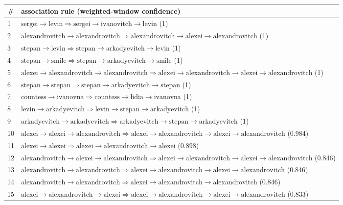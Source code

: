 \begin{appendices}
\begin{longtable}{p{20pt}|p{\dimexpr\textwidth-20pt-\tabcolsep\relax}}
\# & association rule (weighted-window confidence) \\
\hline
1 & $ \text{sergei} \to \text{levin} \Rightarrow \text{sergei} \to \text{ivanovitch} \to \text{levin} $ (1) \\
2 & $ \text{alexandrovitch} \to \text{alexandrovitch} \Rightarrow \text{alexandrovitch} \to \text{alexei} \to \text{alexandrovitch} $ (1) \\
3 & $ \text{stepan} \to \text{levin} \Rightarrow \text{stepan} \to \text{arkadyevitch} \to \text{levin} $ (1) \\
4 & $ \text{stepan} \to \text{smile} \Rightarrow \text{stepan} \to \text{arkadyevitch} \to \text{smile} $ (1) \\
5 & $ \text{alexei} \to \text{alexandrovitch} \to \text{alexandrovitch} \Rightarrow \text{alexei} \to \text{alexandrovitch} \to \text{alexei} \to \text{alexandrovitch} $ (1) \\
6 & $ \text{stepan} \to \text{stepan} \Rightarrow \text{stepan} \to \text{arkadyevitch} \to \text{stepan} $ (1) \\
7 & $ \text{countess} \to \text{ivanovna} \Rightarrow \text{countess} \to \text{lidia} \to \text{ivanovna} $ (1) \\
8 & $ \text{levin} \to \text{arkadyevitch} \Rightarrow \text{levin} \to \text{stepan} \to \text{arkadyevitch} $ (1) \\
9 & $ \text{arkadyevitch} \to \text{arkadyevitch} \Rightarrow \text{arkadyevitch} \to \text{stepan} \to \text{arkadyevitch} $ (1) \\
10 & $ \text{alexei} \to \text{alexei} \to \text{alexandrovitch} \Rightarrow \text{alexei} \to \text{alexandrovitch} \to \text{alexei} \to \text{alexandrovitch} $ (0.984) \\
11 & $ \text{alexei} \to \text{alexei} \Rightarrow \text{alexei} \to \text{alexandrovitch} \to \text{alexei} $ (0.898) \\
12 & $ \text{alexandrovitch} \to \text{alexei} \to \text{alexandrovitch} \Rightarrow \text{alexei} \to \text{alexandrovitch} \to \text{alexei} \to \text{alexandrovitch} $ (0.846) \\
13 & $ \text{alexandrovitch} \to \text{alexandrovitch} \Rightarrow \text{alexei} \to \text{alexandrovitch} \to \text{alexei} \to \text{alexandrovitch} $ (0.846) \\
14 & $ \text{alexandrovitch} \to \text{alexandrovitch} \Rightarrow \text{alexei} \to \text{alexandrovitch} \to \text{alexandrovitch} $ (0.846) \\
15 & $ \text{alexei} \to \text{alexandrovitch} \to \text{alexei} \Rightarrow \text{alexei} \to \text{alexandrovitch} \to \text{alexei} \to \text{alexandrovitch} $ (0.833) \\
\end{longtable}


\end{appendices}
